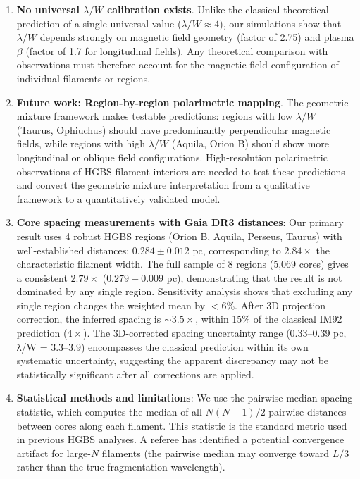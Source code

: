 \documentclass[twoside,twocolumn]{mnras}
\begin{document}
\begin{enumerate}
    \item \textbf{No universal $\lambda/W$ calibration exists}. Unlike the classical theoretical prediction of a single universal value ($\lambda/W \approx 4$), our simulations show that $\lambda/W$ depends strongly on magnetic field geometry (factor of 2.75) and plasma $\beta$ (factor of 1.7 for longitudinal fields). Any theoretical comparison with observations must therefore account for the magnetic field configuration of individual filaments or regions.

    \item \textbf{Future work: Region-by-region polarimetric mapping}. The geometric mixture framework makes testable predictions: regions with low $\lambda/W$ (Taurus, Ophiuchus) should have predominantly perpendicular magnetic fields, while regions with high $\lambda/W$ (Aquila, Orion B) should show more longitudinal or oblique field configurations. High-resolution polarimetric observations of HGBS filament interiors are needed to test these predictions and convert the geometric mixture interpretation from a qualitative framework to a quantitatively validated model.

    \item \textbf{Core spacing measurements with Gaia DR3 distances}: Our primary result uses 4 robust HGBS regions (Orion B, Aquila, Perseus, Taurus) with well-established distances: $0.284 \pm 0.012$ pc, corresponding to $2.84\times$ the characteristic filament width. The full sample of 8 regions (5,069 cores) gives a consistent $2.79\times$ ($0.279 \pm 0.009$ pc), demonstrating that the result is not dominated by any single region. Sensitivity analysis shows that excluding any single region changes the weighted mean by $<6$\%. After 3D projection correction, the inferred spacing is $\sim3.5\times$, within 15\% of the classical IM92 prediction ($4\times$). The 3D-corrected spacing uncertainty range (0.33--0.39 pc, λ/W = 3.3--3.9) encompasses the classical prediction within its own systematic uncertainty, suggesting the apparent discrepancy may not be statistically significant after all corrections are applied.

    \item \textbf{Statistical methods and limitations}\label{sec:statistics}: We use the pairwise median spacing statistic, which computes the median of all $N(N-1)/2$ pairwise distances between cores along each filament. This statistic is the standard metric used in previous HGBS analyses. A referee has identified a potential convergence artifact for large-$N$ filaments (the pairwise median may converge toward $L/3$ rather than the true fragmentation wavelength).


\end{enumerate}
\end{document}
